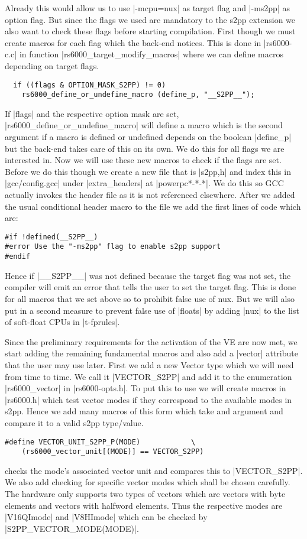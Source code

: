 Already this would allow us to use |-mcpu=nux| as target flag and |-ms2pp| as option flag.
But since the flags we used are mandatory to the s2pp extension we also want to check these flags before starting compilation.
First though we must create macros for each flag which the back-end notices.
This is done in |rs6000-c.c| in function |rs6000_target_modify_macros| where we can define macros depending on target flags.
\begin{lstlisting}
  if ((flags & OPTION_MASK_S2PP) != 0)
    rs6000_define_or_undefine_macro (define_p, "__S2PP__");
\end{lstlisting}

If |flags| and the respective option mask are set, |rs6000_define_or_undefine_macro| will define a macro which is the second argument if a macro is defined or undefined depends on the boolean |define_p| but the back-end takes care of this on its own.
We do this for all flags we are interested in.
Now we will use these new macros to check if the flags are set.
Before we do this though we create a new file that is |s2pp,h| and index this in |gcc/config.gcc| under |extra_headers| at |powerpc*-*-*|.
We do this so GCC actually invokes the header file as it is not referenced elsewhere.
After we added the usual conditional header macro to the file we add the first lines of code which are:
\begin{lstlisting}
#if !defined(__S2PP__)
#error Use the "-ms2pp" flag to enable s2pp support
#endif
\end{lstlisting}
Hence if |__S2PP__| was not defined because the target flag was not set, the compiler will emit an error that tells the user to set the target flag.
This is done for all macros that we set above so to prohibit false use of nux.
But we will also put in a second measure to prevent false use of |floats| by adding |nux| to the list of soft-float CPUs in |t-fprules|.

Since the preliminary requirements for the activation of the VE are now met, we start adding the remaining fundamental macros and also add a |vector| attribute that the user may use later.
First we add a new Vector type which we will need from time to time.
We call it |VECTOR_S2PP| and add it to the enumeration |rs6000_vector| in |rs6000-opts.h|.
To put this to use we will create macros in |rs6000.h| which test vector modes if they correspond to the available modes in s2pp.
Hence we add many macros of this form which take and argument and compare it to a valid s2pp type/value.
\begin{lstlisting}
#define VECTOR_UNIT_S2PP_P(MODE)            \
    (rs6000_vector_unit[(MODE)] == VECTOR_S2PP)
\end{lstlisting}
checks the mode's associated vector unit and compares this to |VECTOR_S2PP|.
We also add checking for specific vector modes which shall be chosen carefully.
The hardware only supports two types of vectors which are vectors with byte elements and vectors with halfword elements.
Thus the respective modes are |V16QImode| and |V8HImode| which can be checked by |S2PP_VECTOR_MODE(MODE)|.

